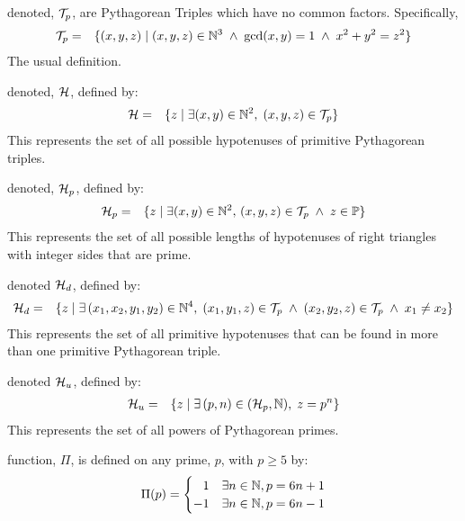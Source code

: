 \documentclass{article}
\theoremstyle{definition}
\begin{document}
 denoted, ${\cal T}_p$, are 
Pythagorean Triples which have no common factors. Specifically,
\begin{eqnarray}
  {\cal T}_p & = & \{ (x,y,z) \; | \; (x,y,z) \in \mathbb{N}^3 \; \wedge \; \gcd(x,y) = 1 \; \wedge \; x^2 + y^2 = z^2 \}
\end{eqnarray}
The usual definition.

 denoted, ${\cal H}$, defined by:
\begin{eqnarray}
  {\cal H} & = & \{ z \; | \; \exists (x,y) \in \mathbb{N}^2, \;  (x,y,z) \in {\cal T}_p \}
\end{eqnarray}
This represents the set of all possible hypotenuses of primitive Pythagorean triples.

 denoted, ${\cal H}_p$, defined by:
\begin{eqnarray}
  {\cal H}_p & = & \{ z \; | \; \exists (x,y) \in \mathbb{N}^2, \, (x,y,z) \in {\cal T}_p \; \wedge \; z \in \mathbb{P} \}
\end{eqnarray}
This represents the set of all possible lengths of hypotenuses of right 
triangles with integer sides that are prime.

 denoted ${\cal H}_d$, defined by:
\begin{eqnarray}
  {\cal H}_{d} & = & \{ z \; | \; \exists\, (x_1, x_2, y_1, y_2) \in \mathbb{N}^4, \; 
      (x_1,y_1,z) \in {\cal T}_p \; \wedge \; (x_2, y_2, z) \in {\cal T}_p \; \wedge \; x_1 \neq x_2 \}  
\end{eqnarray}
This represents the set of all primitive hypotenuses that can be found in 
more than one primitive Pythagorean triple.

 denoted ${\cal H}_u$, defined by:
\begin{eqnarray}
  {\cal H}_u & = & \{ z \; | \; \exists\,(p,n) \in ({\cal H}_p, \mathbb{N}), \; z = p^n \}
\end{eqnarray}
This represents the set of all powers of Pythagorean primes.


 function, $\Pi$, is defined on any prime, $p$, with $p \ge 5$ by:
\begin{eqnarray}
  \Pi(p) = \begin{cases}
  \hphantom{-}1\hfil & \exists n \in \mathbb{N}, p = 6n + 1 \\
            -1 \hfil & \exists n \in \mathbb{N}, p = 6n - 1 \\
             \end{cases} 
\end{eqnarray}
\end{document}
